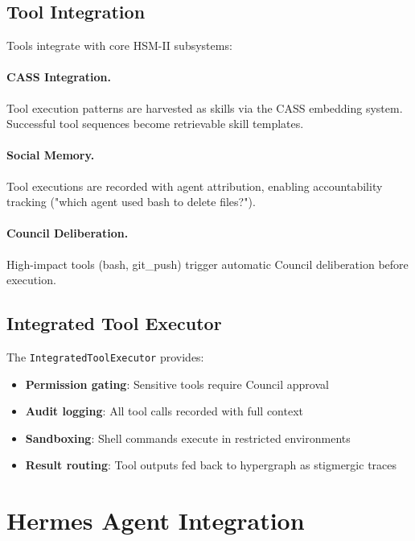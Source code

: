 \documentclass[11pt]{article}
\begin{document}
\subsection{Tool Integration}

Tools integrate with core HSM-II subsystems:

\paragraph{CASS Integration.} Tool execution patterns are harvested as skills
via the CASS embedding system. Successful tool sequences become retrievable
skill templates.

\paragraph{Social Memory.} Tool executions are recorded with agent attribution,
enabling accountability tracking ("which agent used bash to delete files?").

\paragraph{Council Deliberation.} High-impact tools (bash, git\_push) trigger
automatic Council deliberation before execution.

\subsection{Integrated Tool Executor}

The \texttt{IntegratedToolExecutor} provides:
\begin{itemize}[noitemsep,topsep=4pt]
  \item \textbf{Permission gating}: Sensitive tools require Council approval
  \item \textbf{Audit logging}: All tool calls recorded with full context
  \item \textbf{Sandboxing}: Shell commands execute in restricted environments
  \item \textbf{Result routing}: Tool outputs fed back to hypergraph as stigmergic traces
\end{itemize}

\section{Hermes Agent Integration}
\nopagebreak[4]
\label{sec:hermes}
\end{document}
